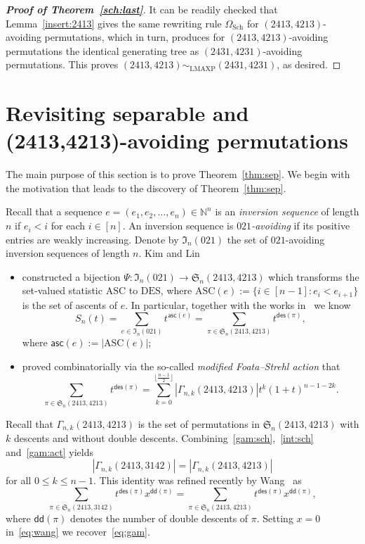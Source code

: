 \documentclass[12pt]{amsart}
\numberwithin{equation}{section}
\theoremstyle{plain}
\theoremstyle{definition}
\newcommand{\N}{\mathbb{N}}
\newcommand{\I}{\mathfrak{I}}
\def\des{\mathsf{des}}
\def\S{\mathfrak{S}}
\def\DES{\mathrm{DES}}
\def\ASC{\mathrm{ASC}}
\def\LMAXP{\mathrm{LMAXP}}
\def\asc{\mathsf{asc}}
\def\dd{\mathsf{dd}}
\begin{document}
\begin{proof}[{\bf Proof of Theorem~\ref{sch:last}}]
It can be readily checked that Lemma~\ref{insert:2413} gives the same rewriting rule $\Omega_{\mathrm{Sch}}$ for $(2413,4213)$-avoiding permutations, which in turn, produces for $(2413,4213)$-avoiding permutations the identical generating tree as $(2431,4231)$-avoiding permutations. This proves $(2413,4213)\sim_{\LMAXP}(2431,4231)$, as desired. 
\end{proof}




\section{Revisiting separable and (2413,4213)-avoiding permutations}
\label{sec:revisit}

The main purpose of this section is to prove Theorem~\ref{thm:sep}. We begin with the motivation that leads to the discovery of Theorem~\ref{thm:sep}.

Recall that a sequence $e=(e_1,e_2,\ldots,e_n)\in\N^n$ is an {\em inversion sequence} of length $n$ if $e_i<i$ for each $i\in[n]$. An inversion sequence is {\em$021$-avoiding} if its positive entries are weakly increasing. Denote by $\I_n(021)$ the set of $021$-avoiding inversion sequences of length $n$.  Kim and Lin~\cite{LK} 
\begin{itemize}
\item constructed a bijection $\Psi:\I_n(021)\rightarrow\S_n(2413,4213)$ which transforms the set-valued statistic $\ASC$ to $\DES$, where $\ASC(e):=\{i\in[n-1]: e_i<e_{i+1}\}$ is the set of ascents of $e$. In particular,  together with the works in~\cite{cor,flz,lin} we know  
\begin{equation}\label{int:sch}
S_n(t)=\sum_{e\in\I_n(021)}t^{\asc(e)}=\sum_{\pi\in\S_n(2413,4213)}t^{\des(\pi)},
\end{equation}
where $\asc(e):=|\ASC(e)|$;
\item proved combinatorially via the so-called {\em modified Foata--Strehl action} that
\begin{equation}\label{gam:act}
\sum_{\pi\in\S_n(2413,4213)}t^{\des(\pi)}=\sum_{k=0}^{\lfloor\frac{n-1}{2}\rfloor}|\Gamma_{n,k}(2413,4213)|t^k(1 + t)^{n-1-2k}.
\end{equation}
\end{itemize}
Recall that $\Gamma_{n,k}(2413,4213)$ is the set of permutations in $\S_n(2413,4213)$ with $k$ descents and without double descents. Combining~\eqref{gam:sch},~\eqref{int:sch} and~\eqref{gam:act} yields 
\begin{equation}\label{eq:gam}
|\Gamma_{n,k}(2413,3142)|=|\Gamma_{n,k}(2413,4213)|
\end{equation} 
for all $0\leq k\leq n-1$. This identity was refined recently by Wang~\cite{wan} as
\begin{equation}\label{eq:wang}
\sum_{\pi\in\S_n(2413,3142)}t^{\des(\pi)}x^{\dd(\pi)}=\sum_{\pi\in\S_n(2413,4213)}t^{\des(\pi)}x^{\dd(\pi)},
\end{equation} 
where $\dd(\pi)$ denotes the number of double descents of $\pi$. Setting $x=0$ in~\eqref{eq:wang} we recover~\eqref{eq:gam}. 
\end{document}
